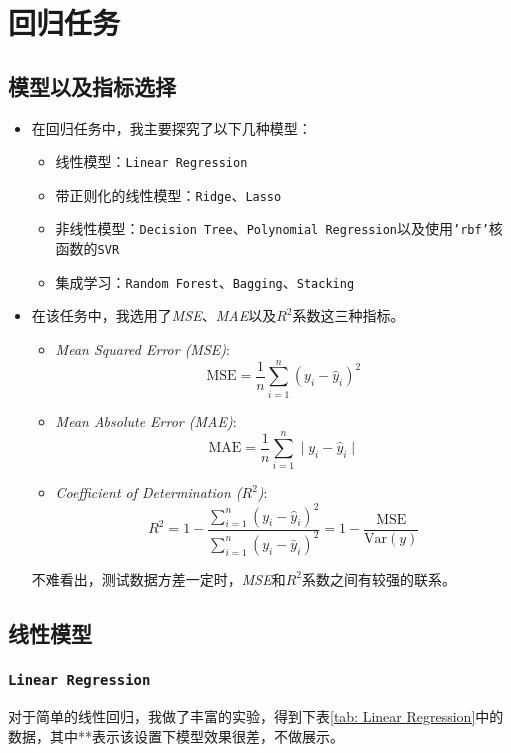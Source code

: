 \documentclass[12pt, a4paper, oneside]{ctexart}
\begin{document}
\section{回归任务}
\subsection{模型以及指标选择}
\begin{itemize}
    \item 
    {
        在回归任务中，我主要探究了以下几种模型：
\begin{itemize}
    \item 线性模型：\texttt{Linear Regression}
    \item 带正则化的线性模型：\texttt{Ridge}、\texttt{Lasso}
    \item 非线性模型：\texttt{Decision Tree}、\texttt{Polynomial Regression}以及使用\texttt{'rbf'}核函数的\texttt{SVR}
    \item 集成学习：\texttt{Random Forest}、\texttt{Bagging}、\texttt{Stacking}
\end{itemize}
    }
    \item 
    {
        在该任务中，我选用了\emph{MSE}、\emph{MAE}以及\emph{$R^2$}系数这三种指标。
\begin{itemize}
    \item \emph{Mean Squared Error (MSE)}:
    \[
    \text{MSE} = \frac{1}{n} \sum_{i=1}^{n} \left( y_i - \hat{y}_i \right)^2
    \]

    \item \emph{Mean Absolute Error (MAE)}:
    \[
    \text{MAE} = \frac{1}{n} \sum_{i=1}^{n} \mid y_i - \hat{y}_i \mid
    \]

    \item \emph{Coefficient of Determination ($R^2$)}:
    \[
    R^2 = 1 - \frac{\sum_{i=1}^{n} \left( y_i - \hat{y}_i \right)^2}{\sum_{i=1}^{n} \left( y_i - \bar{y}_i \right)^2} = 1 - \frac{\text{MSE}}{\text{Var}(y)}
    \]
\end{itemize}

        不难看出，测试数据方差一定时，\emph{MSE}和\emph{$R^2$}系数之间有较强的联系。
    }
\end{itemize}

\subsection{线性模型}
\subsubsection{\texttt{Linear Regression}}
对于简单的线性回归，我做了丰富的实验，得到下表\ref{tab: Linear Regression}中的数据，其中**表示该设置下模型效果很差，不做展示。
\end{document}
